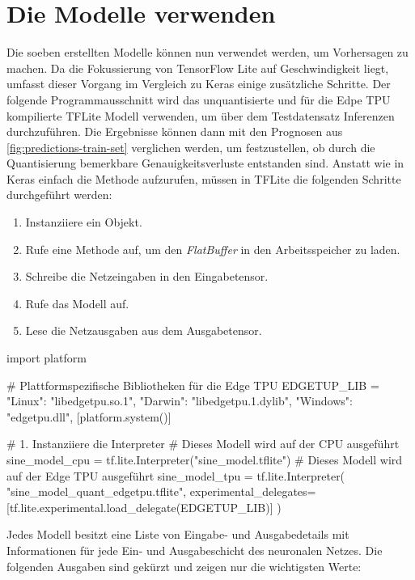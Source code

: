\section{Die Modelle verwenden}
Die soeben erstellten Modelle können nun verwendet werden, um
Vorhersagen zu machen.
Da die Fokussierung von TensorFlow Lite auf Geschwindigkeit
liegt, umfasst dieser Vorgang im Vergleich zu Keras einige
zusätzliche Schritte. Der folgende Programmausschnitt
wird das unquantisierte und für die Edpe TPU
kompilierte TFLite Modell verwenden, um über dem Testdatensatz Inferenzen
durchzuführen. Die Ergebnisse können dann mit den Prognosen
aus \autoref{fig:predictions-train-set} verglichen werden,
um festzustellen, ob durch die Quantisierung bemerkbare
Genauigkeitsverluste entstanden sind.
Anstatt wie in Keras einfach die 
Methode aufzurufen, müssen in TFLite die folgenden
Schritte durchgeführt werden:
\begin{enumerate}
  \item Instanziiere ein  Objekt.
  \item Rufe eine Methode auf, um den
        \textit{FlatBuffer} in den Arbeitsspeicher zu laden.
  \item Schreibe die Netzeingaben in den Eingabetensor.
  \item Rufe das Modell auf.
  \item Lese die Netzausgaben aus dem Ausgabetensor.
\end{enumerate}
\begin{pythoncode}
import platform

# Plattformspezifische Bibliotheken für die Edge TPU
EDGETUP_LIB = {
    "Linux": "libedgetpu.so.1",
    "Darwin": "libedgetpu.1.dylib",
    "Windows": "edgetpu.dll",
}[platform.system()]

# 1. Instanziiere die Interpreter
# Dieses Modell wird auf der CPU ausgeführt
sine_model_cpu = tf.lite.Interpreter("sine_model.tflite")
# Dieses Modell wird auf der Edge TPU ausgeführt
sine_model_tpu = tf.lite.Interpreter(
    "sine_model_quant_edgetpu.tflite",
    experimental_delegates=[tf.lite.experimental.load_delegate(EDGETUP_LIB)]
)
\end{pythoncode}
Jedes Modell besitzt eine Liste von Eingabe- und Ausgabedetails
mit Informationen für jede Ein- und Ausgabeschicht des neuronalen Netzes.
Die folgenden Ausgaben sind gekürzt und zeigen nur die wichtigsten Werte:
